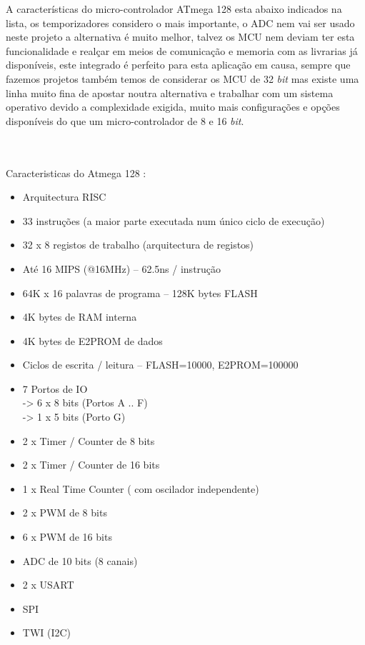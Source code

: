 \newpage
A características do micro-controlador ATmega 128 esta abaixo indicados na lista, os temporizadores considero o mais importante, o ADC nem vai ser usado neste projeto a alternativa é muito melhor, talvez os MCU nem deviam ter esta funcionalidade e realçar em meios de comunicação e memoria com as livrarias já disponíveis, este integrado é perfeito para esta aplicação em causa, sempre que fazemos projetos também temos de considerar os MCU de 32 \textit{bit} mas existe uma linha muito fina de apostar noutra alternativa e trabalhar com um sistema operativo devido a complexidade exigida, muito mais configurações e opções disponíveis do que um micro-controlador de 8 e 16 \textit{bit}.
\\
\\
\\
\begin{minipage}{\linewidth}
{\Large Caracteristicas do Atmega 128 :}
\begin{itemize}	
	\setlength\itemsep{-0.3em}
	\item Arquitectura RISC
	\item 33 instruções (a maior parte executada num único ciclo de execução)
	\item 32 x 8 registos de trabalho (arquitectura de registos)
	\item Até 16 MIPS (@16MHz) – 62.5ns / instrução
	\item 64K x 16 palavras de programa – 128K bytes FLASH
	\item 4K bytes de RAM interna
	\item 4K bytes de E2PROM de dados
	\item Ciclos de escrita / leitura – FLASH=10000, E2PROM=100000
	\item 7 Portos de IO \\
		\hspace*{.5cm}	-> 6 x 8 bits (Portos A .. F) \\
		\hspace*{.5cm}	-> 1 x 5 bits (Porto G)
	\item 2 x Timer / Counter de 8 bits
	\item 2 x Timer / Counter de 16 bits
	\item 1 x Real Time Counter ( com oscilador independente)
	\item 2 x PWM de 8 bits
	\item 6 x PWM de 16 bits
	\item ADC de 10 bits (8 canais)
	\item 2 x USART
	\item SPI
	\item TWI (I2C)
\end{itemize}
\end{minipage}
